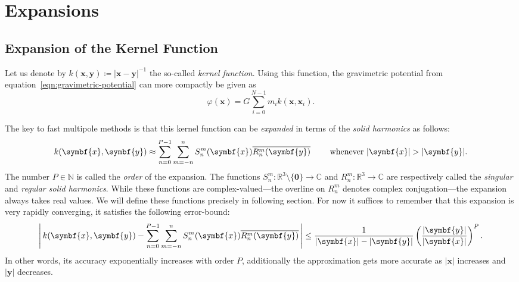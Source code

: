 \documentclass{scrbook}
\newcommand{\naturals}{\ensuremath{\mathbb{N}}}
\newcommand{\reals}{\ensuremath{\mathbb{R}}}
\newcommand{\complex}{\mathbb{C}}
\newcommand{\wholespace}{\ensuremath{\reals^3}}
\newcommand{\vv}[1]{\ensuremath{\symbf{#1}}} %
\begin{document}
\section{Expansions}
\subsection{Expansion of the Kernel Function}
Let us denote by $k(\vv{x},\vv{y})\coloneqq |\vv{x}-\vv{y}|^{-1}$ the so-called
\emph{kernel function}. Using this function, the gravimetric potential from
equation~\eqref{eqn:gravimetric-potential} can more compactly be given as
\begin{equation}\label{eqn:kgravimetric-potential}
\varphi(\vv{x})=G\sum_{i=0}^{N-1}m_i k(\vv{x},\vv{x}_i).
\end{equation}

The key to fast multipole methods is that this kernel function can be
\emph{expanded} in terms of the \emph{solid harmonics} as follows:
\begin{equation}\label{eqn:kernel-expansion}
k(\vv{x},\vv{y}) \approx
\sum_{n=0}^{P-1}\sum_{m=-n\vphantom{0}}^n
S_n^m(\vv{x})\overline{R_n^m(\vv{y})}
\qquad\text{ whenever }|\vv{x}| > |\vv{y}|.
\end{equation}
The number $P\in\naturals$ is called the \emph{order} of the expansion.
The functions $S_n^m:\wholespace \setminus \lbrace\vv{0}\rbrace\to\complex$ and
$R_n^m:\wholespace\to\complex$ are respectively called the \emph{singular} and
\emph{regular solid harmonics}. While these functions are complex-valued---the
overline on $R_n^m$ denotes complex conjugation---the expansion always takes
real values. We will define these functions precisely in following section. For
now it suffices to remember that this expansion is very rapidly converging, it
satisfies the following error-bound:\autocite[Theorem~3.2]{greengard1997}
\begin{equation}
\left|\,
k(\vv{x},\vv{y}) - 
\sum_{n=0}^{P-1}\sum_{m=-n\vphantom{0}}^n
S_n^m(\vv{x})\overline{R_n^m(\vv{y})}
\,\right|
\leq \frac{1}{|\vv{x}|-|\vv{y}|}\left(\frac{|\vv{y}|}{|\vv{x}|}\right)^P.
\end{equation}
In other words, its accuracy exponentially increases with order $P$,
additionally the approximation gets more accurate as $|\vv{x}|$ increases and
$|\vv{y}|$ decreases.
\end{document}
